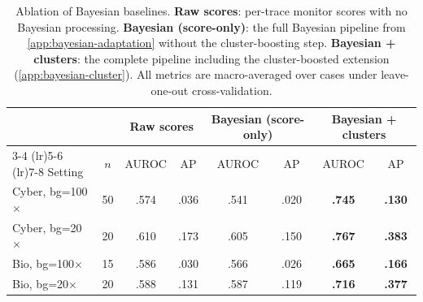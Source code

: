 \documentclass{article} %
\begin{document}
\begin{table}[t]
\centering
\small
\begin{tabular}{@{}l c cc cc cc@{}}
\toprule
& & \multicolumn{2}{c}{Raw scores}
& \multicolumn{2}{c}{Bayesian (score-only)}
& \multicolumn{2}{c}{Bayesian + clusters} \\
\cmidrule(lr){3-4} \cmidrule(lr){5-6} \cmidrule(lr){7-8}
Setting & $n$ & AUROC & AP & AUROC & AP & AUROC & AP \\
\midrule
Cyber, bg=100$\times$ & 50 & .574 & .036 & .541 & .020 & \textbf{.745} & \textbf{.130} \\
Cyber, bg=20$\times$  & 20 & .610 & .173 & .605 & .150 & \textbf{.767} & \textbf{.383} \\
Bio, bg=100$\times$   & 15 & .586 & .030 & .566 & .026 & \textbf{.665} & \textbf{.166} \\
Bio, bg=20$\times$    & 20 & .588 & .131 & .587 & .119 & \textbf{.716} & \textbf{.377} \\
\bottomrule
\end{tabular}
\caption{
  Ablation of Bayesian baselines.
  \textbf{Raw scores}: per-trace monitor scores with no Bayesian processing.
  \textbf{Bayesian (score-only)}: the full Bayesian pipeline from
  \cref{app:bayesian-adaptation} without the cluster-boosting step.
  \textbf{Bayesian + clusters}: the complete pipeline including the
  cluster-boosted extension (\cref{app:bayesian-cluster}).
  All metrics are macro-averaged over cases under leave-one-out
  cross-validation.
}
\label{tab:cluster-ablation}
\end{table}
  
\end{document}
